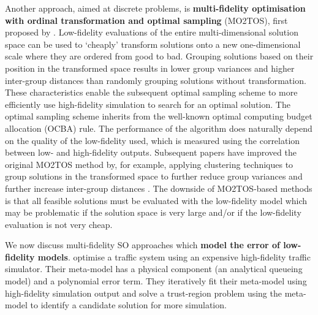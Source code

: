 \documentclass[12pt,a4paper]{article}
\begin{document}
Another approach, aimed at discrete problems, is \textbf{multi-fidelity optimisation with ordinal transformation and optimal sampling} (MO2TOS), first proposed by \cite{xu2016mo2tos}. Low-fidelity evaluations of the entire multi-dimensional solution space can be used to `cheaply' transform solutions onto a new one-dimensional scale where they are ordered from good to bad. Grouping solutions based on their position in the transformed space results in lower group variances and higher inter-group distances than randomly grouping solutions without transformation. These characteristics enable the subsequent optimal sampling scheme to more efficiently use high-fidelity simulation to search for an optimal solution. The optimal sampling scheme inherits from the well-known optimal computing budget allocation (OCBA) rule. The performance of the algorithm does naturally depend on the quality of the low-fidelity used, which is measured using the correlation between low- and high-fidelity outputs. Subsequent papers have improved the original MO2TOS method by, for example, applying clustering techniques to group solutions in the transformed space to further reduce group variances and further increase inter-group distances \citep{cao2023cluster}. The downside of MO2TOS-based methods is that all feasible solutions must be evaluated with the low-fidelity model which may be problematic if the solution space is very large and/or if the low-fidelity evaluation is not very cheap.

We now discuss multi-fidelity SO approaches which \textbf{model the error of low-fidelity models}. \cite{chong2018simulation} optimise a traffic system using an expensive high-fidelity traffic simulator. Their meta-model has a physical component (an analytical queueing model) and a polynomial error term. They iteratively fit their meta-model using high-fidelity simulation output and solve a trust-region problem using the meta-model to identify a candidate solution for more simulation.
\end{document}
